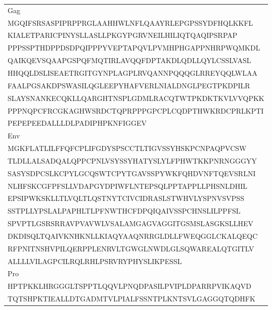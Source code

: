 
\begin{table}[htp]
\begin{center}
\begin{tabulary}{\textwidth}{|L|}
\hline
Gag \bigstrut[t] \\
MGQIFSRSASPIPRPPRGLAAHHWLNFLQAAYRLEPGPSSYDFHQLKKFL \bigstrut[t] \\
KIALETPARICPINYSLLASLLPKGYPGRVNEILHILIQTQAQIPSRPAP \\
PPPSSPTHDPPDSDPQIPPPYVEPTAPQVLPVMHPHGAPPNHRPWQMKDL \\
QAIKQEVSQAAPGSPQFMQTIRLAVQQFDPTAKDLQDLLQYLCSSLVASL \\
HHQQLDSLISEAETRGITGYNPLAGPLRVQANNPQQQGLRREYQQLWLAA \\
FAALPGSAKDPSWASILQGLEEPYHAFVERLNIALDNGLPEGTPKDPILR \\
SLAYSNANKECQKLLQARGHTNSPLGDMLRACQTWTPKDKTKVLVVQPKK \\
PPPNQPCFRCGKAGHWSRDCTQPRPPPGPCPLCQDPTHWKRDCPRLKPTI \\
PEPEPEEDALLLDLPADIPHPKNFIGGEV \bigstrut[b] \\
\hline
Env \bigstrut[t] \\
MGKFLATLILFFQFCPLIFGDYSPSCCTLTIGVSSYHSKPCNPAQPVCSW \bigstrut[t] \\
TLDLLALSADQALQPPCPNLVSYSSYHATYSLYLFPHWTKKPNRNGGGYY \\
SASYSDPCSLKCPYLGCQSWTCPYTGAVSSPYWKFQHDVNFTQEVSRLNI \\
NLHFSKCGFPFSLLVDAPGYDPIWFLNTEPSQLPPTAPPLLPHSNLDHIL \\
EPSIPWKSKLLTLVQLTLQSTNYTCIVCIDRASLSTWHVLYSPNVSVPSS \\
SSTPLLYPSLALPAPHLTLPFNWTHCFDPQIQAIVSSPCHNSLILPPFSL \\
SPVPTLGSRSRRAVPVAVWLVSALAMGAGVAGGITGSMSLASGKSLLHEV \\
DKDISQLTQAIVKNHKNLLKIAQYAAQNRRGLDLLFWEQGGLCKALQEQC \\
RFPNITNSHVPILQERPPLENRVLTGWGLNWDLGLSQWAREALQTGITLV \\
ALLLLVILAGPCILRQLRHLPSRVRYPHYSLIKPESSL \bigstrut[b] \\
\hline
Pro \bigstrut[t] \\
HPTPKKLHRGGGLTSPPTLQQVLPNQDPASILPVIPLDPARRPVIKAQVD \bigstrut[t] \\
TQTSHPKTIEALLDTGADMTVLPIALFSSNTPLKNTSVLGAGGQTQDHFK \\

\end{tabulary}
\end{center}
\end{table}
